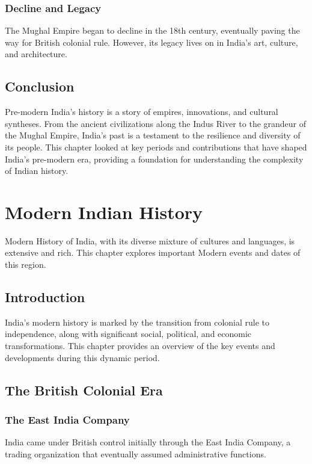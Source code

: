 \documentclass{book}
\begin{document}
\subsection{Decline and Legacy}
The Mughal Empire began to decline in the 18th century, eventually paving the way for British colonial rule. However, its legacy lives on in India’s art, culture, and architecture.

\section{Conclusion}
\label{sec:conclusion-pre-modern-india}
Pre-modern India’s history is a story of empires, innovations, and cultural syntheses. From the ancient civilizations along the Indus River to the grandeur of the Mughal Empire, India’s past is a testament to the resilience and diversity of its people. This chapter looked at key periods and contributions that have shaped India’s pre-modern era, providing a foundation for understanding the complexity of Indian history.

\chapter{Modern Indian History}
\label{ch:modern-indian-history}

Modern History of India, with its diverse mixture of cultures and languages, is extensive and rich. This chapter explores important Modern events and dates of this region.

\section{Introduction}
\label{sec:introduction-modern-india}
India’s modern history is marked by the transition from colonial rule to independence, along with significant social, political, and economic transformations. This chapter provides an overview of the key events and developments during this dynamic period.

\section{The British Colonial Era}
\label{sec:british-colonial-era}

\subsection{The East India Company}
India came under British control initially through the East India Company, a trading organization that eventually assumed administrative functions.
\end{document}
